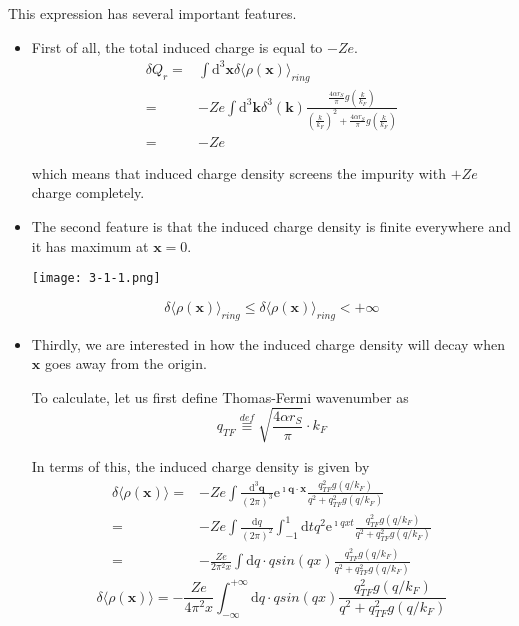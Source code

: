 This expression has several important features.
\begin{itemize}
\item First of all, the total induced charge is equal to $-Z e$.
\begin{equation} \label{Eqs3.1.25} \begin{split}
\delta Q_r =& \int \mathrm{d}^3 \mathbf{x} \delta \langle \rho(\mathbf{x}) \rangle_{ring}\\
=& -Z e \int \mathrm{d}^3 \mathbf{k} \delta^3(\mathbf{k})\frac{\frac{4\alpha r_S}{\pi}g\left( \frac{k}{k_F} \right)}{\left( \frac{k}{k_F} \right)^2+\frac{4\alpha r_S}{\pi}g\left( \frac{k}{k_F} \right)}\\
=& -Z e
\end{split}\end{equation}

which means that induced charge density screens the impurity with $+Z e$ charge completely.

\item The second feature is that the induced charge density is finite everywhere and it has maximum at $\mathbf{x}=0$.

\begin{center} \label{Fig3.1.1}
\texttt{[image: 3-1-1.png]}
\end{center}

\begin{equation}\label{Eqs3.1.26}
\delta \langle \rho(\mathbf{x}) \rangle_{ring} \leq \delta \langle \rho(\mathbf{x}) \rangle_{ring} < +\infty
\end{equation}

\item Thirdly, we are interested in how the induced charge density will decay when $\mathbf{x}$ goes away from the origin.

To calculate, let us first define Thomas-Fermi wavenumber as
\begin{equation} \label{Eqs3.1.27}
q_{TF} \overset{def}{\equiv} \sqrt{\frac{4\alpha r_S}{\pi}} \cdot k_F
\end{equation}

In terms of this, the induced charge density is given by
\[\begin{split} \delta \langle \rho(\mathbf{x}) \rangle =& -Z e \int \frac{\mathrm{d}^3 \mathbf{q}}{(2\pi)^3} \mathrm{e}^{\imath \mathbf{q}\cdot\mathbf{x}} \frac{q_{TF}^2 g(q/k_F)}{q^2 + q_{TF}^2 g(q/k_F)}\\
=& -Z e \int \frac{\mathrm{d} q}{(2\pi)^2} \int_{-1}^{1} \mathrm{d} t q^2 \mathrm{e}^{\imath q x t} \frac{q_{TF}^2 g(q/k_F)}{q^2 + q_{TF}^2 g(q/k_F)}\\
=&-\frac{Z e}{2\pi^2 x} \int \mathrm{d} q \cdot q sin (qx)\frac{q_{TF}^2 g(q/k_F)}{q^2 + q_{TF}^2 g(q/k_F)}
\end{split} \]
\begin{equation} \label{Eqs3.1.28}
\delta \langle \rho(\mathbf{x}) \rangle = -\frac{Z e}{4\pi^2 x} \int_{-\infty}^{+\infty} \mathrm{d} q \cdot q sin(qx) \frac{q_{TF}^2 g(q/k_F)}{q^2 + q_{TF}^2 g(q/k_F)}
\end{equation}


\end{itemize}
